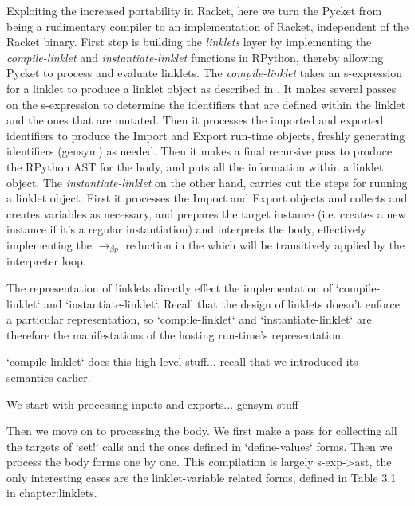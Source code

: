 Exploiting the increased portability in Racket, here we turn the
Pycket from being a rudimentary compiler to an implementation of
Racket, independent of the Racket binary. First step is building the
\emph{linklets} layer by implementing the \emph{compile-linklet} and
\emph{instantiate-linklet} functions in RPython, thereby allowing
Pycket to process and evaluate linklets. The \emph{compile-linklet}
takes an s-expression for a linklet to produce a linklet object as
described in . It makes several
passes on the s-expression to determine the identifiers that are
defined within the linklet and the ones that are mutated. Then it
processes the imported and exported identifiers to produce the Import
and Export run-time objects, freshly generating identifiers (gensym)
as needed. Then it makes a final recursive pass to produce the RPython
AST for the body, and puts all the information within a linklet
object. The \emph{instantiate-linklet} on the other hand, carries out
the steps for running a linklet object. First it processes the Import
and Export objects and collects and creates variables as necessary,
and prepares the target instance (i.e. creates a new instance if it's
a regular instantiation) and interprets the body, effectively
implementing the $\longrightarrow_{\beta p}$ reduction in the 
which will be transitively applied by the interpreter loop.

		\begin{paragraph-here}%
			The representation of linklets directly effect the implementation of `compile-linklet` and `instantiate-linklet`. Recall that the design of linklets doesn't enforce a particular representation, so `compile-linklet` and `instantiate-linklet` are therefore the manifestations of the hosting run-time's representation.
		\end{paragraph-here}

		\begin{paragraph-here}%
			`compile-linklet` does this high-level stuff... recall that we introduced its semantics earlier.
		\end{paragraph-here}

		\begin{paragraph-here}%
			We start with processing inputs and exports... gensym stuff
		\end{paragraph-here}

		\begin{paragraph-here}%
			Then we move on to processing the body. We first make a pass for collecting all the targets of `set!` calls and the ones defined in `define-values` forms. Then we process the body forms one by one. This compilation is largely s-exp->ast, the only interesting cases are the linklet-variable related forms, defined in Table 3.1 in chapter:linklets.
		\end{paragraph-here}

